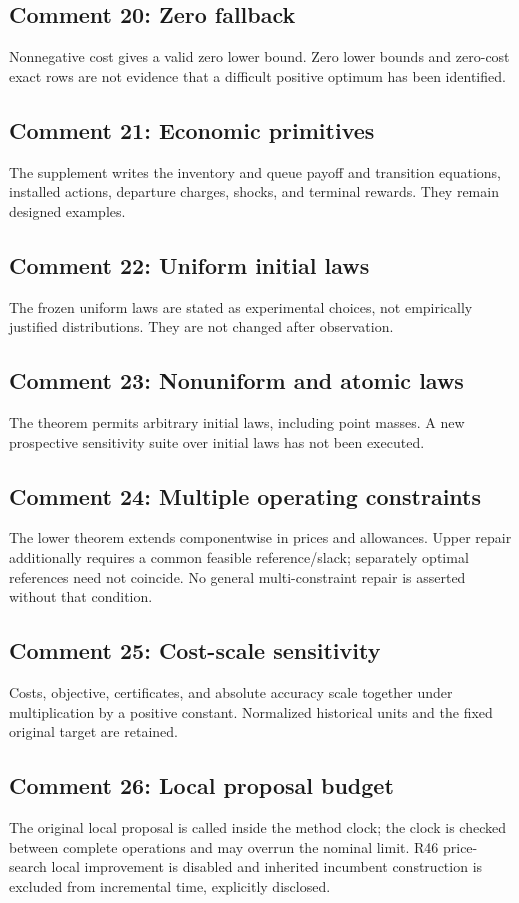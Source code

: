 \subsection{Comment 20: Zero fallback}
Nonnegative cost gives a valid zero lower bound. Zero lower bounds and zero-cost exact rows are not evidence that a difficult positive optimum has been identified.

\subsection{Comment 21: Economic primitives}
The supplement writes the inventory and queue payoff and transition equations, installed actions, departure charges, shocks, and terminal rewards. They remain designed examples.

\subsection{Comment 22: Uniform initial laws}
The frozen uniform laws are stated as experimental choices, not empirically justified distributions. They are not changed after observation.

\subsection{Comment 23: Nonuniform and atomic laws}
The theorem permits arbitrary initial laws, including point masses. A new prospective sensitivity suite over initial laws has not been executed.

\subsection{Comment 24: Multiple operating constraints}
The lower theorem extends componentwise in prices and allowances. Upper repair additionally requires a common feasible reference/slack; separately optimal references need not coincide. No general multi-constraint repair is asserted without that condition.

\subsection{Comment 25: Cost-scale sensitivity}
Costs, objective, certificates, and absolute accuracy scale together under multiplication by a positive constant. Normalized historical units and the fixed original target are retained.

\subsection{Comment 26: Local proposal budget}
The original local proposal is called inside the method clock; the clock is checked between complete operations and may overrun the nominal limit. R46 price-search local improvement is disabled and inherited incumbent construction is excluded from incremental time, explicitly disclosed.

